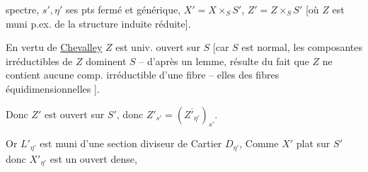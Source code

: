 spectre, $s',\eta'$ ses pts fermé et générique, $X'=X\times_SS'$, $Z'=Z\times_SS'$ [où $Z$ est muni p.ex. de la structure induite réduite].

 En vertu de \uline{Chevalley}  $Z$ est univ. ouvert sur $S$ [car $S$ est normal, les composantes irréductibles de $Z$ dominent $S$ -- \unsure{:} d'après un lemme, résulte du fait que $Z$ ne contient aucune comp. irréductible d'une fibre -- elles  des fibres équidimensionnelles ].

Donc $Z'$ est ouvert sur $S'$, donc $Z'_{s'}=(\overline{Z'_{\eta'}})_{s'}$.

Or $L'_{\eta'}$ est muni d'une section    diviseur de Cartier $D_{\eta'}$,  Comme $X'$ plat sur $S'$ donc $X'_{\eta'}$ est un ouvert dense,

